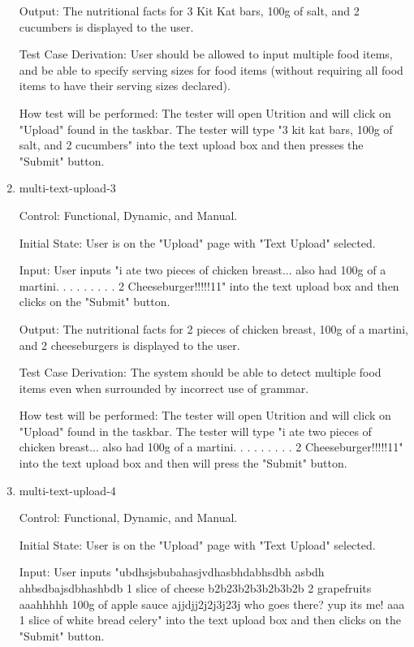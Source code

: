 \documentclass[12pt, titlepage]{article}
\begin{document}
\begin{enumerate}
	Output: The nutritional facts for 3 Kit Kat bars, 100g of salt, and 2 cucumbers is displayed to the user.
	
	Test Case Derivation: User should be allowed to input multiple food items, and be able to specify serving sizes for food items (without requiring all food items to have their serving sizes declared).
	
	How test will be performed: The tester will open Utrition and will click on "Upload" found in the taskbar. The tester will type "3 kit kat bars, 100g of salt, and 2 cucumbers" into the text upload box and then presses the "Submit" button.
	
	\item{multi-text-upload-3\\}
	
	Control: Functional, Dynamic, and Manual.
	
	Initial State: User is on the "Upload" page with "Text Upload" selected.
	
	Input: User inputs "i ate two pieces of chicken breast... also had 100g of a martini. . . . . . . . . 2 Cheeseburger!!!!!11" into the text upload box and then clicks on the "Submit" button.
	
	Output: The nutritional facts for 2 pieces of chicken breast, 100g of a martini, and 2 cheeseburgers is displayed to the user.
	
	Test Case Derivation: The system should be able to detect multiple food items even when surrounded by incorrect use of grammar.
	
	How test will be performed: The tester will open Utrition and will click on "Upload" found in the taskbar. The tester will type "i ate two pieces of chicken breast... also had 100g of a martini. . . . . . . . . 2 Cheeseburger!!!!!11" into the text upload box and then will press the "Submit" button.
	
	\item{multi-text-upload-4\\}
	
	Control: Functional, Dynamic, and Manual.
	
	Initial State: User is on the "Upload" page with "Text Upload" selected.
	
	Input: User inputs "ubdhsjsbubahasjvdhasbhdabhsdbh asbdh ahbsdbajsdbhashbdb 1 slice of cheese b2b23b2b3b2b3b2b 2 grapefruits aaahhhhh 100g of apple sauce ajjdjj2j2j3j23j who goes there? yup its me! aaa 1 slice of white bread celery" into the text upload box and then clicks on the "Submit" button.
	

\end{enumerate}
\end{document}
